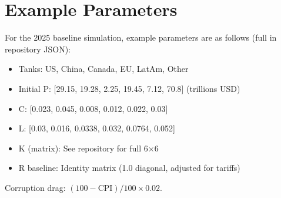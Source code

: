 \documentclass[11pt]{article}
\begin{document}
\section{Example Parameters}
For the 2025 baseline simulation, example parameters are as follows (full in repository JSON):

\begin{itemize}
\item Tanks: US, China, Canada, EU, LatAm, Other
\item Initial P: [29.15, 19.28, 2.25, 19.45, 7.12, 70.8] (trillions USD)
\item C: [0.023, 0.045, 0.008, 0.012, 0.022, 0.03]
\item L: [0.03, 0.016, 0.0338, 0.032, 0.0764, 0.052]
\item K (matrix): See repository for full 6$\times$6
\item R baseline: Identity matrix (1.0 diagonal, adjusted for tariffs)
\end{itemize}

Corruption drag: $(100 - \text{CPI}) / 100 \times 0.02$.
\end{document}
